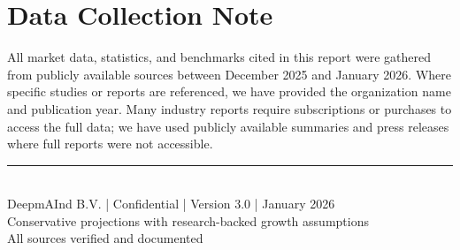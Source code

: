 \documentclass[11pt,a4paper]{report}
\begin{document}
\vspace{1cm}

\section*{Data Collection Note}

All market data, statistics, and benchmarks cited in this report were gathered from publicly available sources between December 2025 and January 2026. Where specific studies or reports are referenced, we have provided the organization name and publication year. Many industry reports require subscriptions or purchases to access the full data; we have used publicly available summaries and press releases where full reports were not accessible.

\vspace{1.5cm}

\begin{center}
    \textcolor{freegray}{\rule{12cm}{0.5pt}}\\[0.4cm]
    \textcolor{freegray}{\small DeepmAInd B.V. | Confidential | Version 3.0 | January 2026}\\[0.2cm]
    \textcolor{freegray}{\scriptsize Conservative projections with research-backed growth assumptions}\\
    \textcolor{freegray}{\scriptsize All sources verified and documented}
\end{center}
\end{document}
